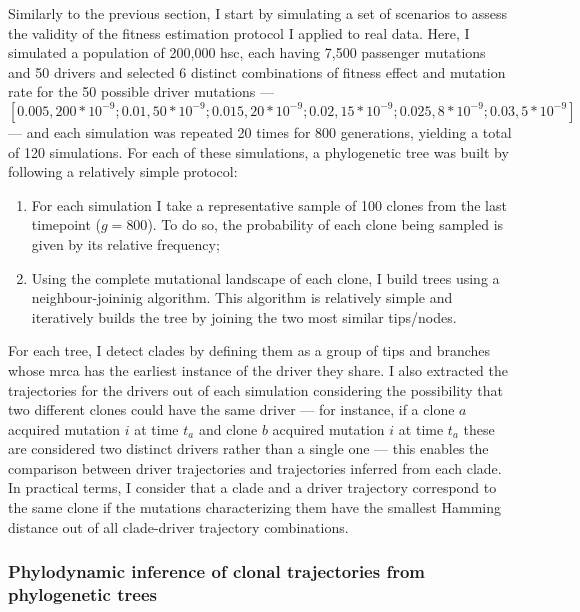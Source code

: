 Similarly to the previous section, I start by simulating a set of scenarios to assess the validity of the fitness estimation protocol I applied to real data. Here, I simulated a population of 200,000 \ac{hsc}, each having 7,500 passenger mutations and 50 drivers and selected 6 distinct combinations of fitness effect and mutation rate for the 50 possible driver mutations --- $[0.005,200*10^{-9}; 0.01,50*10^{-9}; 0.015,20*10^{-9}; 0.02,15*10^{-9}; 0.025,8*10^{-9}; 0.03,5*10^{-9}]$ --- and each simulation was repeated 20 times for 800 generations, yielding a total of 120 simulations. For each of these simulations, a phylogenetic tree was built by following a relatively simple protocol:

\begin{enumerate}
    \item For each simulation I take a representative sample of 100 clones from the last timepoint ($g = 800$). To do so, the probability of each clone being sampled is given by its relative frequency;
    \item Using the complete mutational landscape of each clone, I build trees using a neighbour-joininig algorithm. This algorithm is relatively simple and iteratively builds the tree by joining the two most similar tips/nodes. 
\end{enumerate}

For each tree, I detect clades by defining them as a group of tips and branches whose \ac{mrca} has the earliest instance of the driver they share. I also extracted the trajectories for the drivers out of each simulation considering the possibility that two different clones could have the same driver --- for instance, if a clone $a$ acquired mutation $i$ at time $t_a$ and clone $b$ acquired mutation $i$ at time $t_a$ these are considered two distinct drivers rather than a single one --- this enables the comparison between driver trajectories and trajectories inferred from each clade. In practical terms, I consider that a clade and a driver trajectory correspond to the same clone if the mutations characterizing them have the smallest Hamming distance out of all clade-driver trajectory combinations. 

\subsubsection{Phylodynamic inference of clonal trajectories from phylogenetic trees}

